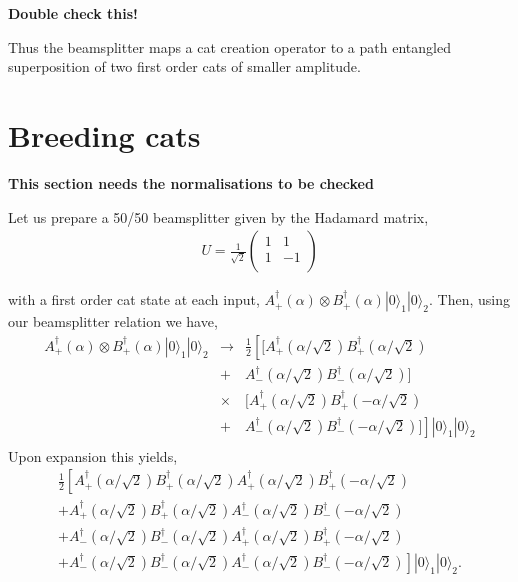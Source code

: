 \documentclass[aps,prl,twocolumn,amsmath,amssymb,nofootinbib,superscriptaddress]{revtex4}
\newcommand{\ket}[1]{|#1\rangle}
\begin{document}
\textbf{Double check this!}

Thus the beamsplitter maps a cat creation operator to a path entangled superposition of two first order cats of smaller amplitude.

\section{Breeding cats}

\textbf{This section needs the normalisations to be checked}

Let us prepare a 50/50 beamsplitter given by the Hadamard matrix,
\begin{eqnarray}
U = \frac{1}{\sqrt{2}} \left( \begin{array}{cc}
1 & 1 \\
1 & -1 \\
\end{array} \right)
\end{eqnarray}

with a first order cat state at each input, $A_+^\dag(\alpha)\otimes B_+^\dag(\alpha)\ket{0}_1 \ket{0}_2$. Then, using our beamsplitter relation we have,
\begin{eqnarray}
A_+^\dag(\alpha)\otimes B_+^\dag(\alpha)\ket{0}_1 \ket{0}_2 &\to&\frac{1}{2}\left[[A_+^\dag(\alpha/\sqrt{2}) B_+^\dag(\alpha/\sqrt{2}) \right.\nonumber \\
&+& A_-^\dag(\alpha/\sqrt{2}) B_-^\dag(\alpha/\sqrt{2})] \nonumber\\
&\times& [A_+^\dag(\alpha/\sqrt{2}) B_+^\dag(-\alpha/\sqrt{2}) \nonumber \\
&+& \left.A_-^\dag(\alpha/\sqrt{2})B_-^\dag(-\alpha/\sqrt{2})]\right]\ket{0}_1 \ket{0}_2 \nonumber \\
\end{eqnarray}
Upon expansion this yields,
\begin{eqnarray}
\frac{1}{2}\left[A_+^\dag(\alpha/\sqrt{2}) B_+^\dag(\alpha/\sqrt{2}) A_+^\dag(\alpha/\sqrt{2}) B_+^\dag(-\alpha/\sqrt{2}) \right. \nonumber \\
+ A_+^\dag(\alpha/\sqrt{2}) B_+^\dag(\alpha/\sqrt{2}) A_-^\dag(\alpha/\sqrt{2})B_-^\dag(-\alpha/\sqrt{2}) \nonumber \\
+ A_-^\dag(\alpha/\sqrt{2})B_-^\dag(\alpha/\sqrt{2}) A_+^\dag(\alpha/\sqrt{2}) B_+^\dag(-\alpha/\sqrt{2}) \nonumber \\
\left. + A_-^\dag(\alpha/\sqrt{2})B_-^\dag(\alpha/\sqrt{2})A_-^\dag(\alpha/\sqrt{2})B_-^\dag(-\alpha/\sqrt{2}) \right]\ket{0}_1 \ket{0}_2.\nonumber \\
\end{eqnarray}
\end{document}
